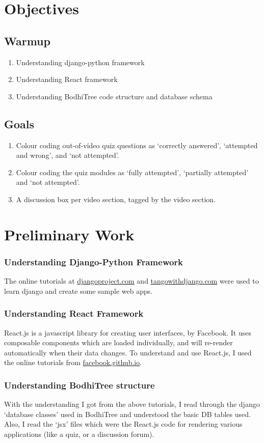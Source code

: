 \section{Objectives}
\subsection{Warmup}
\begin{enumerate}
\item Understanding django-python framework
\item Understanding React framework
\item Understanding BodhiTree code structure and database schema
\end{enumerate}
\subsection{Goals}
\begin{enumerate}
\item Colour coding out-of-video quiz questions as `correctly answered', `attempted and wrong', and `not attempted'.
\item Colour coding the quiz modules as `fully attempted', `partially attempted' and `not attempted'.
\item A discussion box per video section, tagged by the video section.
\end{enumerate}

\section{Preliminary Work}
\subsubsection*{Understanding Django-Python Framework}
The online tutorials at \href{https://docs.djangoproject.com/en/1.8/intro/tutorial01}{djangoproject.com} and \href{http://www.tangowithdjango.com}{tangowithdjango.com} were used to learn django and create some sample web apps.
\subsubsection*{Understanding React Framework}
React.js is a javascript library for creating user interfaces, by Facebook. It uses composable components which are loaded individually, and will re-render automatically when their data changes. To understand and use React.js, I used the online tutorials from \href{https://facebook.github.io/react/docs/tutorial.html}{facebook.github.io}.
\subsubsection*{Understanding BodhiTree structure}
With the understanding I got from the above tutorials, I read through the django `database classes' used in BodhiTree and understood the basic DB tables used. Also, I read the `jsx' files which were the React.js code for rendering various applications (like a quiz, or a discussion forum).